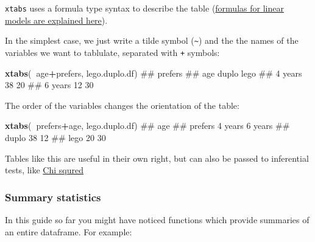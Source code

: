 \documentclass[]{article}
\newenvironment{Shaded}{\begin{snugshade}}{\end{snugshade}}
\newcommand{\KeywordTok}[1]{\textcolor[rgb]{0.13,0.29,0.53}{\textbf{#1}}}
\newcommand{\OperatorTok}[1]{\textcolor[rgb]{0.81,0.36,0.00}{\textbf{#1}}}
\newcommand{\NormalTok}[1]{#1}
\theoremstyle{definition}
\theoremstyle{definition}
\theoremstyle{definition}
\theoremstyle{remark}
\begin{document}
\texttt{xtabs} uses a formula type syntax to describe the table
(\protect\hyperlink{formulae}{formulas for linear models are explained
here}).

In the simplest case, we just write a tilde symbol
(\texttt{\textasciitilde{}}) and the the names of the variables we want
to tablulate, separated with \texttt{+} symbols:

\begin{Shaded}
\begin{Highlighting}[]
\KeywordTok{xtabs}\NormalTok{(}\OperatorTok{~}\NormalTok{age}\OperatorTok{+}\NormalTok{prefers, lego.duplo.df)}
\NormalTok{##          prefers}
\NormalTok{## age       duplo lego}
\NormalTok{##   4 years    38   20}
\NormalTok{##   6 years    12   30}
\end{Highlighting}
\end{Shaded}

The order of the variables changes the orientation of the table:

\begin{Shaded}
\begin{Highlighting}[]
\KeywordTok{xtabs}\NormalTok{(}\OperatorTok{~}\NormalTok{prefers}\OperatorTok{+}\NormalTok{age, lego.duplo.df)}
\NormalTok{##        age}
\NormalTok{## prefers 4 years 6 years}
\NormalTok{##   duplo      38      12}
\NormalTok{##   lego       20      30}
\end{Highlighting}
\end{Shaded}

Tables like this are useful in their own right, but can also be passed
to inferential tests, like \protect\hyperlink{crosstabs}{Chi squred}

\subsubsection*{Summary statistics}\label{summary-statistics}

In this guide so far you might have noticed functions which provide
summaries of an entire dataframe. For example:
\end{document}
